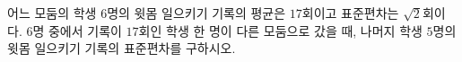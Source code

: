 어느 모둠의 학생 $6$명의 윗몸 일으키기 기록의 평균은 $17$회이고 표준편차는 $\sqrt{2}$회이다. $6$명 중에서 기록이 $17$회인 학생 한 명이 다른 모둠으로 갔을 때, 나머지 학생 $5$명의 윗몸 일으키기 기록의 표준편차를 구하시오.
